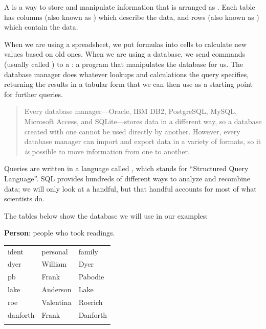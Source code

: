 \documentclass{book}
\begin{document}
A  is a way to
store and manipulate information that is arranged as
. Each table has columns (also known
as ) which describe the data, and
rows (also known as ) which contain
the data.

When we are using a spreadsheet, we put formulas into cells to calculate
new values based on old ones. When we are using a database, we send
commands (usually called ) to a
: a program that
manipulates the database for us. The database manager does whatever
lookups and calculations the query specifies, returning the results in a
tabular form that we can then use as a starting point for further
queries.

\begin{quote}
Every database manager---Oracle, IBM DB2, PostgreSQL, MySQL, Microsoft
Access, and SQLite---stores data in a different way, so a database
created with one cannot be used directly by another. However, every
database manager can import and export data in a variety of formats, so
it \emph{is} possible to move information from one to another.
\end{quote}

Queries are written in a language called , which
stands for ``Structured Query Language''. SQL provides hundreds of
different ways to analyze and recombine data; we will only look at a
handful, but that handful accounts for most of what scientists do.

The tables below show the database we will use in our examples:

\textbf{Person}: people who took readings.

\begin{tabular}{@{}lll@{}}
\hline\noalign{\medskip}
ident & personal & family
\\\noalign{\medskip}
\hline\noalign{\medskip}
dyer & William & Dyer
\\\noalign{\medskip}
pb & Frank & Pabodie
\\\noalign{\medskip}
lake & Anderson & Lake
\\\noalign{\medskip}
roe & Valentina & Roerich
\\\noalign{\medskip}
danforth & Frank & Danforth
\\\noalign{\medskip}
\hline
\end{tabular}
\end{document}
